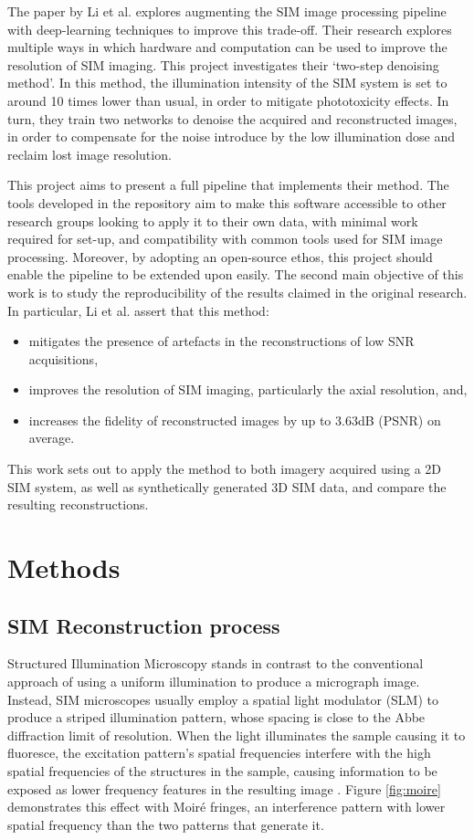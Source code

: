 \documentclass[12pt]{article}
\begin{document}
The paper by Li et al. \cite{keypaper} explores augmenting the SIM image processing pipeline with deep-learning techniques to improve this trade-off.
Their research explores multiple ways in which hardware and computation can be used to improve the resolution of SIM imaging.
This project investigates their `two-step denoising method'.
In this method, the illumination intensity of the SIM system is set to around 10 times lower than usual,
in order to mitigate phototoxicity effects.
In turn, they train two networks to denoise the acquired and reconstructed images,
in order to compensate for the noise introduce by the low illumination dose and reclaim lost image resolution.

This project aims to present a full pipeline that implements their method.
The tools developed in the repository aim to make this software accessible to other research groups looking to apply it to their own data,
with minimal work required for set-up, and compatibility with common tools used for SIM image processing.
Moreover, by adopting an open-source ethos, this project should enable the pipeline to be extended upon easily.
The second main objective of this work is to study the reproducibility of the results claimed in the original research.
In particular, Li et al. assert that this method:
\begin{itemize}
    \item mitigates the presence of artefacts in the reconstructions of low SNR acquisitions,
    \item improves the resolution of SIM imaging, particularly the axial resolution, and,
    \item increases the fidelity of reconstructed images by up to 3.63dB (PSNR) on average.
\end{itemize}
This work sets out to apply the method to both imagery acquired using a 2D SIM system,
as well as synthetically generated 3D SIM data, and compare the resulting reconstructions.

\section{Methods}

\subsection{SIM Reconstruction process}


Structured Illumination Microscopy stands in contrast to the conventional approach of using a uniform illumination to produce a micrograph image.
Instead, SIM microscopes usually employ a spatial light modulator (SLM) to produce a striped illumination pattern,
whose spacing is close to the Abbe diffraction limit of resolution.
When the light illuminates the sample causing it to fluoresce,
the excitation pattern's spatial frequencies interfere with the high spatial frequencies of the structures in the sample,
causing information to be exposed as lower frequency features in the resulting image \cite{originalSIM}.
Figure \ref{fig:moire} demonstrates this effect with Moir\'{e} fringes,
an interference pattern with lower spatial frequency than the two patterns that generate it.
\end{document}
